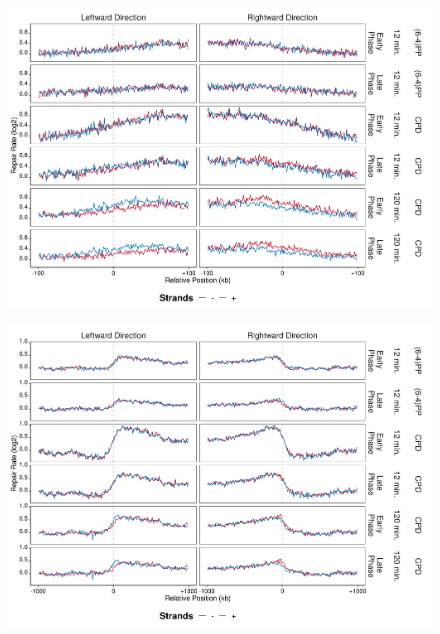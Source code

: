 \begin{figure}[H]
\begin{center}
\includegraphics[width=\textwidth]{Chapters/7_appendix/figures/supfig65}
\caption[]{}
\label{supfig:}
\end{center}
\end{figure}

\begin{figure}[H]
\begin{center}
\includegraphics[width=\textwidth]{Chapters/7_appendix/figures/supfig66}
\caption[]{}
\label{supfig:}
\end{center}
\end{figure}

